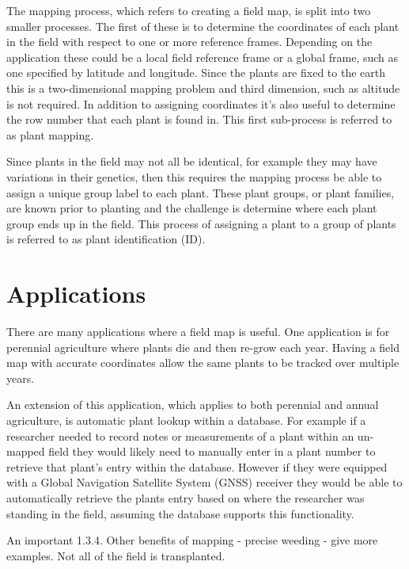 The mapping process, which refers to creating a field map, is split into two smaller processes.  The first of these is to determine the coordinates of each plant in the field with respect to one or more reference frames.  Depending on the application these could be a local field reference frame or a global frame, such as one specified by latitude and longitude.  Since the plants are fixed to the earth this is a two-dimensional mapping problem and third dimension, such as altitude is not required.  In addition to assigning coordinates it's also useful to determine the row number that each plant is found in.  This first sub-process is referred to as plant mapping. 

Since plants in the field may not all be identical, for example they may have variations in their genetics, then this requires the mapping process be able to assign a unique group label to each plant.  These plant groups, or plant families, are known prior to planting and the challenge is determine where each plant group ends up in the field.  This process of assigning a plant to a group of plants is referred to as plant identification (ID).

\section{Applications}

There are many applications where a field map is useful.  One application is for perennial agriculture where plants die and then re-grow each year.  Having a field map with accurate coordinates allow the same plants to be tracked over multiple years.

An extension of this application, which applies to both perennial and annual agriculture, is automatic plant lookup within a database.  For example if a researcher needed to record notes or measurements of a plant within an un-mapped field they would likely need to manually enter in a plant number to retrieve that plant's entry within the database.  However if they were equipped with a Global Navigation Satellite System (GNSS) receiver they would be able to automatically retrieve the plants entry based on where the researcher was standing in the field, assuming the database supports this functionality. 

An important  
1.3.4.	Other benefits of mapping - precise weeding - give more examples.  Not all of the field is transplanted. 

